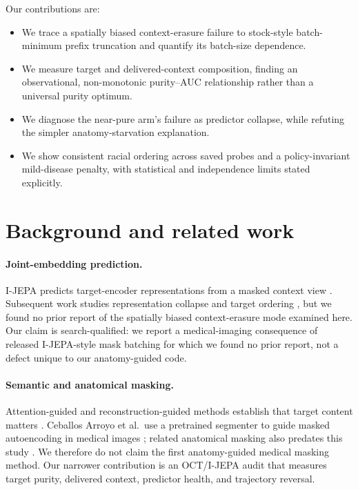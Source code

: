 \documentclass{article}
\begin{document}
Our contributions are:
\begin{itemize}
  \item We trace a spatially biased context-erasure failure to stock-style
  batch-minimum prefix truncation and quantify its batch-size dependence.
  \item We measure target and delivered-context composition, finding an
  observational, non-monotonic purity--AUC relationship rather than a universal
  purity optimum.
  \item We diagnose the near-pure arm's failure as predictor collapse, while
  refuting the simpler anatomy-starvation explanation.
  \item We show consistent racial ordering across saved probes and a
  policy-invariant mild-disease penalty, with statistical and independence
  limits stated explicitly.
\end{itemize}

\section{Background and related work}

\paragraph{Joint-embedding prediction.}
I-JEPA predicts target-encoder representations from a masked context view
\citep{assran2023ijepa}. Subsequent work studies representation collapse and
target ordering \citep{mo2024cjepa,he2025dseqjepa}, but we found no prior
report of the spatially biased context-erasure mode examined here. Our claim is
search-qualified: we report a medical-imaging consequence of released
I-JEPA-style mask batching for which we found no prior report, not a defect
unique to our anatomy-guided code.

\paragraph{Semantic and anatomical masking.}
Attention-guided and reconstruction-guided methods establish that target
content matters \citep{kakogeorgiou2022attmask,li2024anatomask}.
Ceballos Arroyo et al.\ use a pretrained segmenter to guide masked
autoencoding in medical images \citep{ceballosarroyo2026anatomymae}; related
anatomical masking also predates this study \citep{huang2025amap}. We therefore
do not claim the first anatomy-guided medical masking method. Our narrower
contribution is an OCT/I-JEPA audit that measures target purity, delivered
context, predictor health, and trajectory reversal.
\end{document}
